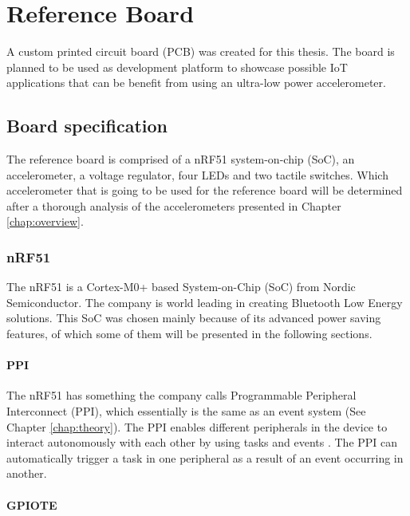 \chapter{Reference Board}
\label{chap:reference}

A custom printed circuit board (PCB) was created for this thesis. The board is planned to be used as development platform to showcase possible IoT applications that can be benefit from using an ultra-low power accelerometer.

\section{Board specification}

The reference board is comprised of a nRF51 system-on-chip (SoC), an accelerometer, a voltage regulator, four LEDs and two tactile switches. Which accelerometer that is going to be used for the reference board will be determined after a thorough analysis of the accelerometers presented in Chapter \ref{chap:overview}.


\subsection{nRF51}

The nRF51 is a Cortex-M0+ based System-on-Chip (SoC) from Nordic Semiconductor. The company is world leading in creating Bluetooth Low Energy solutions. This SoC was chosen mainly because of its advanced power saving features, of which some of them will be presented in the following sections. 

\subsubsection{PPI}

The nRF51 has something the company calls Programmable Peripheral Interconnect (PPI), which essentially is the same as an event system (See Chapter \ref{chap:theory}). The PPI enables different peripherals in the device to interact autonomously with each other by using tasks and events \cite[~p.26]{nrf51}. The PPI can automatically trigger a task in one peripheral as a result of an event occurring in another. 

\subsubsection{GPIOTE}

